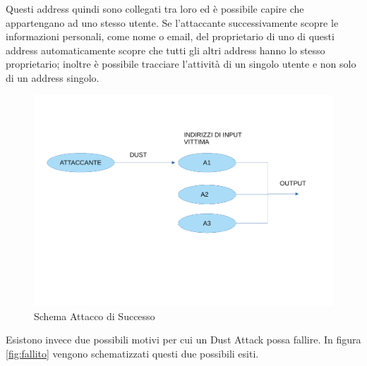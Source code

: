 Questi address quindi sono collegati tra loro ed è possibile capire che appartengano ad uno stesso utente. Se l'attaccante successivamente scopre le informazioni personali, come nome o email, del proprietario di uno di questi address automaticamente scopre che tutti gli altri address hanno lo stesso proprietario; inoltre è possibile tracciare l'attività di un singolo utente e non solo di un address singolo.\\
\begin{figure}[h!]
    \centering
    \includegraphics[scale=0.5]{Images/successo.pdf}
    \caption{Schema Attacco di Successo}
    \label{fig:success}
\end{figure}
\FloatBarrier
Esistono invece due possibili motivi per cui un Dust Attack possa fallire. In figura \ref{fig:fallito} vengono schematizzati questi due possibili esiti.

